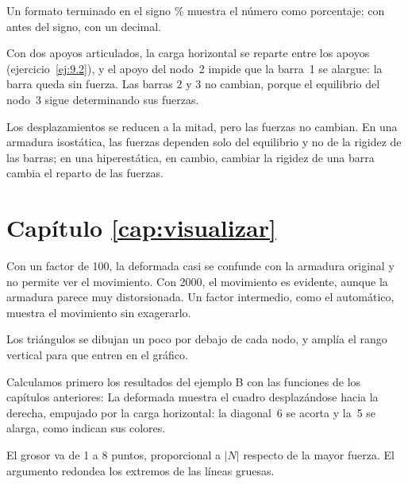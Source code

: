 Un formato terminado en el signo \% muestra el número como porcentaje; con
 antes del signo, con un decimal.

Con dos apoyos articulados, la carga horizontal se reparte entre los apoyos
(ejercicio~\ref{ej:9.2}), y el apoyo del nodo~2 impide que la barra~1 se
alargue: la barra queda sin fuerza. Las barras 2 y 3 no cambian, porque el
equilibrio del nodo~3 sigue determinando sus fuerzas.

Los desplazamientos se reducen a la mitad, pero las fuerzas no cambian. En
una armadura isostática, las fuerzas dependen solo del equilibrio y no de la
rigidez de las barras; en una hiperestática, en cambio, cambiar la rigidez de
una barra cambia el reparto de las fuerzas.

\section*{Capítulo \ref{cap:visualizar}}

Con un factor de 100, la deformada casi se confunde con la armadura original y
no permite ver el movimiento. Con 2000, el movimiento es evidente, aunque la
armadura parece muy distorsionada. Un factor intermedio, como el automático,
muestra el movimiento sin exagerarlo.

Los triángulos se dibujan un poco por debajo de cada nodo, y
 amplía el rango vertical para que entren en el gráfico.

Calculamos primero los resultados del ejemplo B con las funciones de los
capítulos anteriores:
La deformada muestra el cuadro desplazándose hacia la derecha, empujado por la
carga horizontal: la diagonal~6 se acorta y la~5 se alarga, como indican sus
colores.

El grosor va de 1 a 8 puntos, proporcional a $|N|$ respecto de la mayor
fuerza. El argumento  redondea los extremos de
las líneas gruesas.

